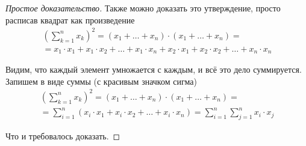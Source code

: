 \begin{proof}[Простое доказательство]
    Также можно доказать это утверждение, просто расписав квадрат как
    произведение
    \begin{align*}
        \left( \sum_{k=1}^{n} x_k \right)^2
        = \left( x_1 + \dots + x_n \right)
            \cdot \left( x_1 + \dots + x_n \right) = \\
        = x_1 \cdot x_1 + x_1 \cdot x_2 + \dots + x_1 \cdot x_n
            + x_2 \cdot x_1 + x_2 \cdot x_2 + \dots + x_n \cdot x_n
    \end{align*}

    Видим, что каждый элемент умножается с каждым, и всё это дело суммируется.
    Запишем в виде суммы (с красивым значком сигма)
    \begin{align*}
        \left( \sum_{k=1}^{n} x_k \right)^2
        = \left( x_1 + \dots + x_n \right)
            \cdot \left( x_1 + \dots + x_n \right) = \\
        = \sum_{i=1}^{n}
            \left( x_i \cdot x_1 + x_i \cdot x_2 + \dots + x_i \cdot x_n \right)
        = \sum_{i=1}^{n} \sum_{j=1}^{n} x_i \cdot x_j
    \end{align*}

    Что и требовалось доказать.
\end{proof}

